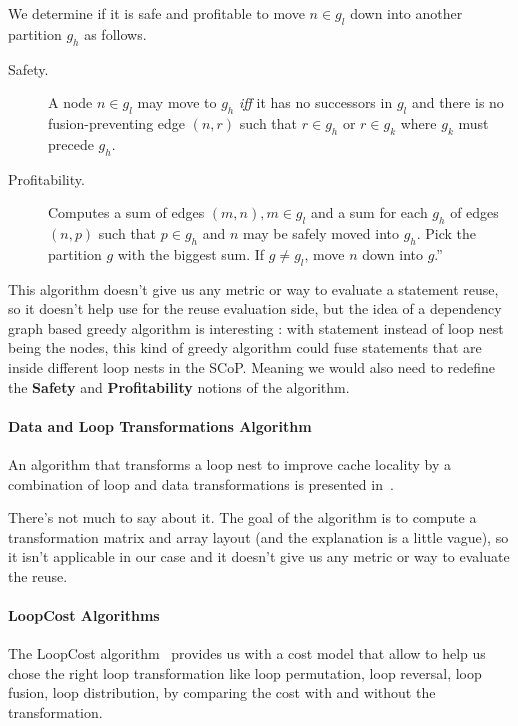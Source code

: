 \documentclass[paper=a4, fontsize=11.5pt]{scrartcl}
\numberwithin{equation}{section}        %
\numberwithin{figure}{section}          %
\numberwithin{table}{section}               %
\begin{document}
                We determine if it is safe and profitable to move $n \in g_l$ down
                into another partition $g_h$ as follows.
                \begin{description}
                    \item [Safety.] A node $n \in g_l$ may move to $g_h$ \textit{iff} it
                        has no successors in $g_l$ and there is no fusion-preventing
                        edge $(n,r)$ such that $r \in g_h$ or $r \in g_k$ where
                        $g_k$ must precede $g_h$.
                    \item [Profitability.] Computes a sum of edges $(m,n), m \in g_l$
                        and a sum for each $g_h$ of edges $(n,p)$ such that $p \in g_h$
                        and $n$ may be safely moved into $g_h$. Pick the partition
                        $g$ with the biggest sum. If $g \neq g_l$, move $n$ down into $g$.''
                \end{description}
            \bigskip
            
            This algorithm doesn't give us any metric or way to evaluate a statement
            reuse, so it doesn't help use for the reuse evaluation side, but the idea
            of a dependency graph based greedy algorithm is interesting : with statement
            instead of loop nest being the nodes, this kind of greedy algorithm 
            could fuse statements that are inside different loop nests in the SCoP.
            Meaning we would also need to redefine the \textbf{Safety} and \textbf{Profitability}
            notions of the algorithm.

        \paragraph{Data and Loop Transformations Algorithm}
            An algorithm that transforms a loop nest to improve cache locality
            by a combination of loop and data transformations is presented in~\cite{Kandemir99improvingcache}.

            There's not much to say about it. The goal of the algorithm is to
            compute a transformation matrix and array layout (and the explanation is a little
            vague), so it isn't applicable in our case and it doesn't give us any metric or way to evaluate the reuse.
        
        \paragraph{LoopCost Algorithms}
            The LoopCost algorithm~\cite{McKinley:1996:IDL:233561.233564} provides
            us with a cost model that allow to help us chose the right loop transformation like
            loop permutation, loop reversal, loop fusion, loop distribution,
            by comparing the cost with and without the transformation.
            
\end{document}
